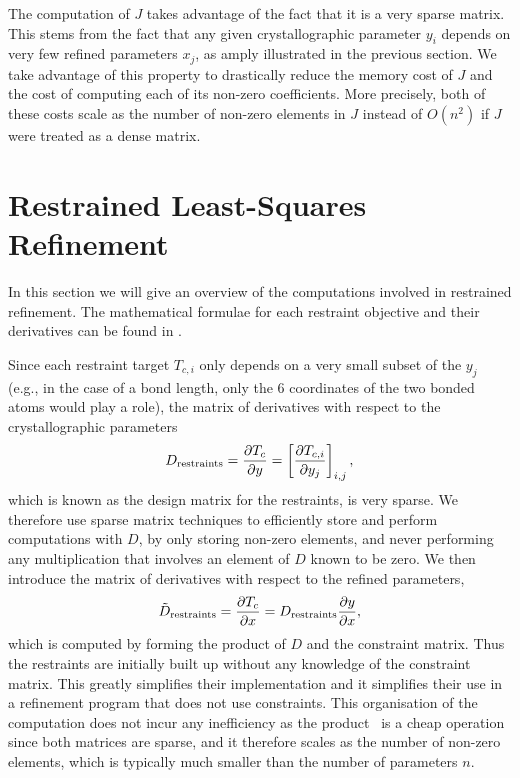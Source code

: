 \documentclass[pdf]{iucr}
\newcommand{\partialder}[2]{\frac{\partial #1}{\partial #2}}
\begin{document}
The computation of $J$ takes advantage of the fact that it is a very sparse matrix. This stems from the fact that any given crystallographic parameter $y_i$ depends on very few refined parameters $x_j$, as amply illustrated in the previous section. We take advantage of this property to drastically reduce the memory cost of $J$ and the cost of computing each of its non-zero coefficients. More precisely, both of these costs scale as the number of non-zero elements in $J$ instead of $O(n^2)$ if $J$ were treated as a dense matrix.

\section{Restrained Least-Squares Refinement}
\label{sec:restraints}

In this section we will give an overview of the computations involved in restrained refinement. The mathematical formulae for each restraint objective and their derivatives can be found in .

Since each restraint target $T_{c,i}$ only depends on a very small subset of the $y_j$ (e.g., in the case of a bond length, only the 6 coordinates of the two bonded atoms would play a role), the matrix of derivatives with respect to the crystallographic parameters
\begin{align}
D_\restraints = \partialder{T_c}{y} = \left[\partialder{T_{c,i}}{y_j}\right]_{i,j},
\end{align}
which is known as the design matrix for the restraints, is very sparse. We therefore use sparse matrix techniques to efficiently store and perform computations with $D$, by only storing non-zero elements, and never performing any multiplication that involves an element of $D$ known to be zero. We then introduce the matrix of derivatives with respect to the refined parameters,
\begin{align}
\tilde{D}_\restraints = \partialder{T_c}{x} = D_\restraints \partialder{y}{x},
\label{eqn:constraints:applied:torestraints}
\end{align}
which is computed by forming the product of $D$ and the constraint matrix. Thus the restraints are initially built up without any knowledge of the constraint matrix. This greatly simplifies their implementation and it simplifies their use in a refinement program that does not use constraints. This organisation of the computation does not incur any inefficiency as the product~ is a cheap operation since both matrices are sparse, and it therefore scales as the number of non-zero elements, which is typically much smaller than the number of parameters $n$. 
\end{document}

